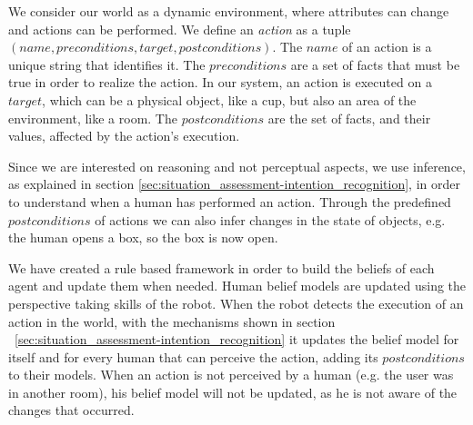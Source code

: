 We consider our world as a dynamic environment, where attributes can change and actions can be performed.  We define an \textit{action} as a tuple $(name, preconditions, target, postconditions)$. The $name$ of an action is a unique string that identifies it. The $preconditions$ are a set of facts that must be true in order to realize the action. In our system, an action is executed on a $target$, which can be a physical object, like a cup, but also an area of the environment, like a room. The $postconditions$ are the set of facts, and their values, affected by the action's execution.

Since we are interested on reasoning and not perceptual aspects, we use inference, as explained in section \ref{sec:situation_assessment-intention_recognition}, in order to understand when a human has performed an action. Through the predefined $postconditions$ of actions we can also infer changes in the state of objects, e.g. the human opens a box, so the box is now open. 

We have created a rule based framework in order to build the beliefs of each agent and update them when needed. Human belief models are updated using the perspective taking skills of the robot. When the robot detects the execution of an action in the world, with the mechanisms shown in section ~\ref{sec:situation_assessment-intention_recognition}
it updates the belief model for itself and for every human that can perceive the action, adding its $postconditions$ to their models. When an action is not perceived by a human (e.g. the user was in another room), his belief model will not be updated, as he is not aware of the changes that occurred.

